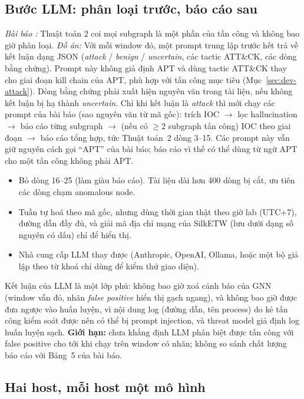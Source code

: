 \subsection{Bước LLM: phân loại trước, báo cáo sau}
\label{sec:dev-llm}

\textit{Bài báo \cite{aly2025ocrapt}:} Thuật toán 2 coi mọi subgraph là một phần của tấn công và không bao giờ phân loại. \textit{Đồ án:} Với mỗi window đỏ, một prompt trung lập trước hết trả về kết luận dạng JSON (\emph{attack} / \emph{benign} / \emph{uncertain}, các tactic ATT\&CK, các dòng bằng chứng). Prompt này không giả định APT và dùng tactic ATT\&CK thay cho giai đoạn kill chain của APT, phù hợp với tấn công mục tiêu (Mục~\ref{sec:dev-attack}). Dòng bằng chứng phải xuất hiện nguyên văn trong tài liệu, nếu không kết luận bị hạ thành \emph{uncertain}. Chỉ khi kết luận là \emph{attack} thì mới chạy các prompt của bài báo (sao nguyên văn từ mã gốc): trích IOC $\rightarrow$ lọc hallucination $\rightarrow$ báo cáo từng subgraph $\rightarrow$ (nếu có $\ge 2$ subgraph tấn công) IOC theo giai đoạn $\rightarrow$ báo cáo tổng hợp, tức Thuật toán~2 dòng 3--15. Các prompt này vẫn giữ nguyên cách gọi ``APT'' của bài báo; báo cáo vì thế có thể dùng từ ngữ APT cho một tấn công không phải APT.
\begin{itemize}
    \item Bỏ dòng 16--25 (làm giàu báo cáo). Tài liệu dài hơn 400 dòng bị cắt, ưu tiên các dòng chạm anomalous node.
    \item Tuần tự hoá theo mã gốc, nhưng dùng thời gian thật theo giờ lab (UTC+7), đường dẫn đầy đủ, và giải mã địa chỉ mạng của SilkETW (lưu dưới dạng số nguyên có dấu) chỉ để hiển thị.
    \item Nhà cung cấp LLM thay được (Anthropic, OpenAI, Ollama, hoặc một bộ giả lập theo từ khoá chỉ dùng để kiểm thử giao diện).
\end{itemize}
Kết luận của LLM là một lớp phủ: không bao giờ xoá cảnh báo của GNN (window vẫn đỏ, nhãn \emph{false positive} hiển thị gạch ngang), và không bao giờ được đưa ngược vào huấn luyện, vì nội dung log (đường dẫn, tên process) do kẻ tấn công kiểm soát được nên có thể bị prompt injection, và threat model giả định log huấn luyện sạch. \textbf{Giới hạn:} chưa khẳng định LLM phân biệt được tấn công với false positive cho tới khi chạy trên window có nhãn; không so sánh chất lượng báo cáo với Bảng~5 của bài báo.

\subsection{Hai host, mỗi host một mô hình}
\label{sec:dev-hosts}

